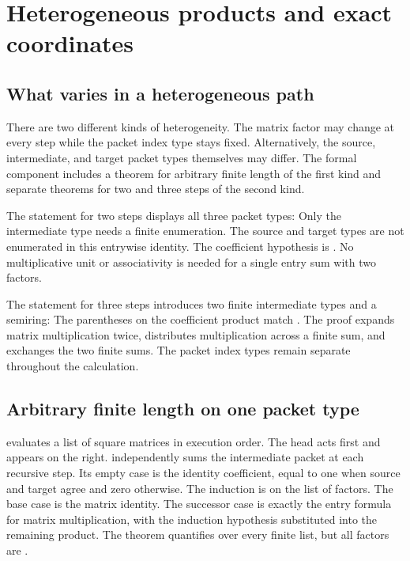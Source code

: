 \clearpage
\section{Heterogeneous products and exact coordinates}
\subsection{What varies in a heterogeneous path}
There are two different kinds of heterogeneity. The matrix factor may change at every step while the packet index type stays fixed. Alternatively, the source, intermediate, and target packet types themselves may differ. The formal component includes a theorem for arbitrary finite length of the first kind and separate theorems for two and three steps of the second kind.

The statement for two steps displays all three packet types:
Only the intermediate type  needs a finite enumeration. The source and target types are not enumerated in this entrywise identity. The coefficient hypothesis is . No multiplicative unit or associativity is needed for a single entry sum with two factors.

The statement for three steps introduces two finite intermediate types and a semiring:
The parentheses on the coefficient product match . The proof expands matrix multiplication twice, distributes multiplication across a finite sum, and exchanges the two finite sums. The packet index types remain separate throughout the calculation.

\subsection{Arbitrary finite length on one packet type}
 evaluates a list of square matrices in execution order. The head acts first and appears on the right.  independently sums the intermediate packet at each recursive step. Its empty case is the identity coefficient, equal to one when source and target agree and zero otherwise.
The induction is on the list of factors. The base case is the matrix identity. The successor case is exactly the entry formula for matrix multiplication, with the induction hypothesis substituted into the remaining product. The theorem quantifies over every finite list, but all factors are .

